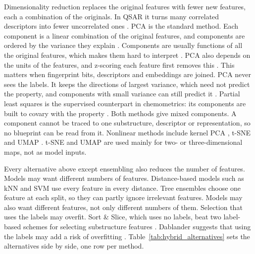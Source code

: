 Dimensionality reduction replaces the original features with fewer new features, each a combination of the originals. In QSAR it turns many correlated descriptors into fewer uncorrelated ones \citep{Niazi2023}. PCA is the standard method. Each component is a linear combination of the original features, and components are ordered by the variance they explain \citep{Jolliffe2016}. Components are usually functions of all the original features, which makes them hard to interpret \citep{Jolliffe2016}. PCA also depends on the units of the features, and z-scoring each feature first removes this \citep{Jolliffe2016}. This matters when fingerprint bits, descriptors and embeddings are joined. PCA never sees the labels. It keeps the directions of largest variance, which need not predict the property, and components with small variance can still predict it \citep{Jolliffe1982}. Partial least squares is the supervised counterpart in chemometrics: its components are built to covary with the property \citep{Wold2001}. Both methods give mixed components. A component cannot be traced to one substructure, descriptor or representation, so no blueprint can be read from it. Nonlinear methods include kernel PCA \citep{Niazi2023}, t-SNE \citep{vanderMaaten2008} and UMAP \citep{McInnes2018}. t-SNE and UMAP are used mainly for two- or three-dimensional maps, not as model inputs.

Every alternative above except ensembling also reduces the number of features. Models may want different numbers of features. Distance-based models such as kNN and SVM use every feature in every distance. Tree ensembles choose one feature at each split, so they can partly ignore irrelevant features. Models may also want different features, not only different numbers of them. Selection that uses the labels may overfit. Sort \& Slice, which uses no labels, beat two label-based schemes for selecting substructure features \citep{sns}. Dablander suggests that using the labels may add a risk of overfitting \citep[p.~138]{Dablander2024}. Table~\ref{tab:hybrid_alternatives} sets the alternatives side by side, one row per method.

